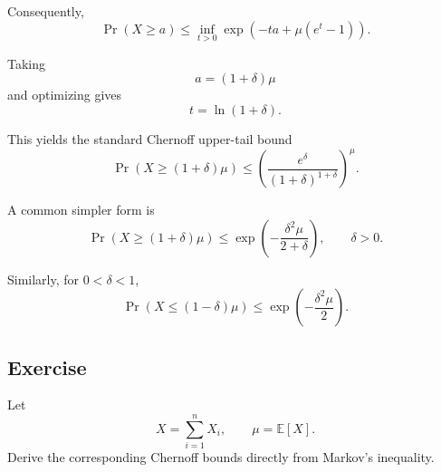 \documentclass[11pt]{article}
\newcommand{\Prob}{\operatorname{Pr}}
\newcommand{\E}{\mathbb{E}}
\begin{document}
Consequently,
\[
  \Prob(X\ge a)
  \le
  \inf_{t>0}
  \exp\!\left(-ta+\mu(e^t-1)\right).
\]

Taking
\[
  a=(1+\delta)\mu
\]
and optimizing gives
\[
  t=\ln(1+\delta).
\]

This yields the standard Chernoff upper-tail bound
\[
  \Prob\!\left(X\ge(1+\delta)\mu\right)
  \le
  \left(
    \frac{e^\delta}{(1+\delta)^{1+\delta}}
  \right)^\mu.
\]

A common simpler form is
\[
  \Prob\!\left(X\ge(1+\delta)\mu\right)
  \le
  \exp\!\left(-\frac{\delta^2\mu}{2+\delta}\right),
  \qquad \delta>0.
\]

Similarly, for $0<\delta<1$,
\[
  \Prob\!\left(X\le(1-\delta)\mu\right)
  \le
  \exp\!\left(-\frac{\delta^2\mu}{2}\right).
\]

\subsection*{Exercise}

Let
\[
  X=\sum_{i=1}^n X_i,
  \qquad
  \mu=\E[X].
\]
Derive the corresponding Chernoff bounds directly from Markov's inequality.
\end{document}
